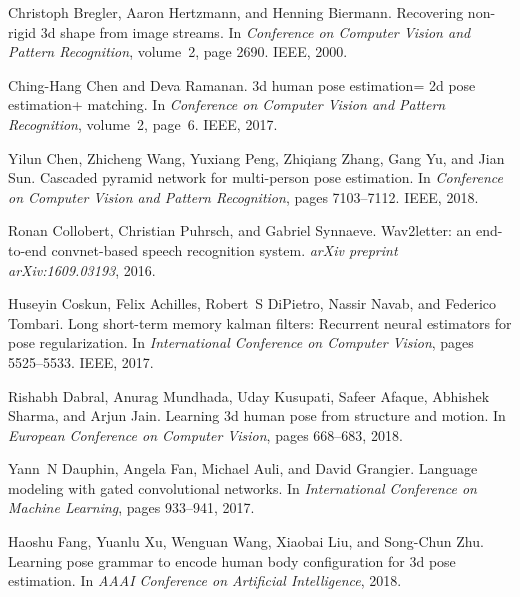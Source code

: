 \documentclass{bmvc2k}
\begin{document}
\begin{thebibliography}{42}
Christoph Bregler, Aaron Hertzmann, and Henning Biermann.
\newblock Recovering non-rigid 3d shape from image streams.
\newblock In \emph{Conference on Computer Vision and Pattern Recognition},
  volume~2, page 2690. IEEE, 2000.

Ching-Hang Chen and Deva Ramanan.
\newblock 3d human pose estimation= 2d pose estimation+ matching.
\newblock In \emph{Conference on Computer Vision and Pattern Recognition},
  volume~2, page~6. IEEE, 2017.

Yilun Chen, Zhicheng Wang, Yuxiang Peng, Zhiqiang Zhang, Gang Yu, and Jian Sun.
\newblock Cascaded pyramid network for multi-person pose estimation.
\newblock In \emph{Conference on Computer Vision and Pattern Recognition},
  pages 7103--7112. IEEE, 2018.

Ronan Collobert, Christian Puhrsch, and Gabriel Synnaeve.
\newblock Wav2letter: an end-to-end convnet-based speech recognition system.
\newblock \emph{arXiv preprint arXiv:1609.03193}, 2016.

Huseyin Coskun, Felix Achilles, Robert~S DiPietro, Nassir Navab, and Federico
  Tombari.
\newblock Long short-term memory kalman filters: Recurrent neural estimators
  for pose regularization.
\newblock In \emph{International Conference on Computer Vision}, pages
  5525--5533. IEEE, 2017.

Rishabh Dabral, Anurag Mundhada, Uday Kusupati, Safeer Afaque, Abhishek Sharma,
  and Arjun Jain.
\newblock Learning 3d human pose from structure and motion.
\newblock In \emph{European Conference on Computer Vision}, pages 668--683,
  2018.

Yann~N Dauphin, Angela Fan, Michael Auli, and David Grangier.
\newblock Language modeling with gated convolutional networks.
\newblock In \emph{International Conference on Machine Learning}, pages
  933--941, 2017.

Haoshu Fang, Yuanlu Xu, Wenguan Wang, Xiaobai Liu, and Song-Chun Zhu.
\newblock Learning pose grammar to encode human body configuration for 3d pose
  estimation.
\newblock In \emph{AAAI Conference on Artificial Intelligence}, 2018.


\end{thebibliography}
\end{document}
